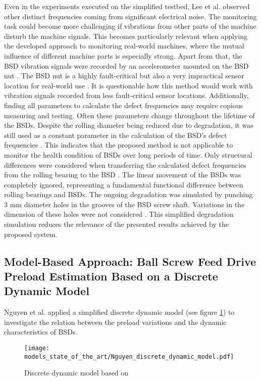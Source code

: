 Even in the experiments executed on the simplified testbed, Lee et al. \cite{Lee2015} observed other distinct frequencies coming from significant electrical noise. The monitoring task could become more challenging if vibrations from other parts of the machine disturb the machine signals. This becomes particularly relevant when applying the developed approach to monitoring real-world machines, where the mutual influence of different machine parts is especially strong. Apart from that, the BSD vibration signals were recorded by an accelerometer mounted on the BSD nut \cite{Lee2015}. The BSD nut is a highly fault-critical but also a very impractical sensor location for real-world use \cite{Pandhare2021}. It is questionable how this method would work with vibration signals recorded from less fault-critical sensor locations. Additionally, finding all parameters to calculate the defect frequencies may require copious measuring and testing. Often these parameters change throughout the lifetime of the BSDs. Despite the rolling diameter being reduced due to degradation, it was still used as a constant parameter in the calculation of the BSD’s defect frequencies \cite{Denkena2021} \cite{Pandhare2021}. This indicates that the proposed method is not applicable to monitor the health condition of BSDs over long periods of time. Only structural differences were considered when transferring the calculated defect frequencies from the rolling bearing to the BSD \cite{Lee2015}. The linear movement of the BSDs was completely ignored, representing a fundamental functional difference between rolling bearings and BSDs. The ongoing degradation was simulated by punching 3 mm diameter holes in the grooves of the BSD screw shaft. Variations in the dimension of these holes were not considered \cite{Lee2015}. This simplified degradation simulation reduces the relevance of the presented results achieved by the proposed system.

\subsection{Model-Based Approach: Ball Screw Feed Drive Preload Estimation Based on a Discrete Dynamic Model}
Nguyen et al. \cite{NGUYEN2019} applied a simplified discrete dynamic model (see figure \ref{fig:Nguyen_discrete_dynamic_model}) to investigate the relation between the preload variations and the dynamic characteristics of BSDs.

\begin{figure}[H]
  \centering
  \texttt{[image: models\_state\_of\_the\_art/Nguyen\_discrete\_dynamic\_model.pdf]}
  \caption{Discrete dynamic model based on \cite{NGUYEN2019}}
  \label{fig:Nguyen_discrete_dynamic_model}
\end{figure}

